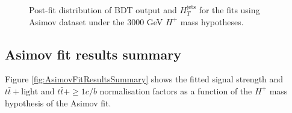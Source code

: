 \begin{figure}[H]
  \caption{Post-fit distribution of BDT output and $H_{T}^{\text{jets}}$ for the fits using Asimov dataset under the 3000 GeV $H^{+}$ mass hypotheses.}
  \label{fig:Postfit_Hp3000_asimov}
\end{figure}
\subsection{Asimov fit results summary}
\label{subsec:AsimovFitResultSummary}
Figure \ref{fig:AsimovFitResultsSummary} shows the fitted signal strength and $t\bar{t}+\text{light}$ and $t\bar{t}+{\geq}1c/b$ normalisation factors as a function of the $H^{+}$ mass hypothesis of the Asimov fit.

